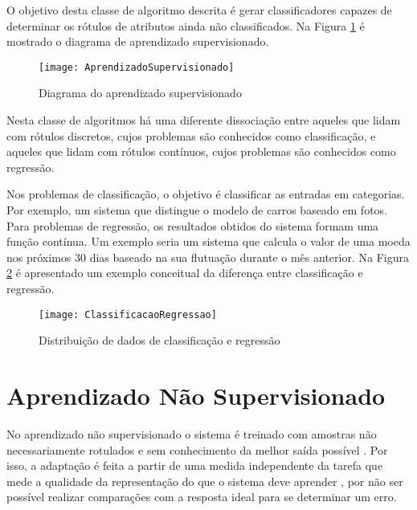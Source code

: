  O objetivo desta classe de algoritmo descrita é gerar classificadores capazes de determinar os rótulos de atributos ainda não classificados.\cite{haykin2009neural, goldschmidt} Na Figura \ref{fig:supervisionado} é mostrado o diagrama de aprendizado supervisionado.
 
 \begin{figure}[htb]
 \caption{\label{fig:supervisionado} Diagrama do aprendizado supervisionado}
 \begin{center}
 \texttt{[image: AprendizadoSupervisionado]}
 \end{center}
 \end{figure}
 
 Nesta classe de algoritmos há uma diferente dissociação entre aqueles que lidam com rótulos discretos, cujos problemas são conhecidos como classificação, e aqueles que lidam com rótulos contínuos, cujos problemas são conhecidos como regressão. 
 
 Nos problemas de classificação, o objetivo é classificar as entradas em categorias. Por exemplo, um sistema que distingue o modelo de carros baseado em fotos. Para problemas de regressão, os resultados obtidos do sistema formam uma função contínua. Um exemplo seria um sistema que calcula o valor de uma moeda nos próximos 30 dias baseado na sua flutuação durante o mês anterior. Na Figura \ref{fig:classregres} é apresentado um exemplo conceitual da diferença entre classificação e regressão.
 
 \begin{figure}[htb]
 \caption{\label{fig:classregres} Distribuição de dados de classificação e regressão}
 \begin{center}
 \texttt{[image: ClassificacaoRegressao]}
 \end{center}
 \end{figure}


\section{Aprendizado Não Supervisionado}
\label{sec:nsuperv}

 No aprendizado não supervisionado o sistema é treinado com amostras não necessariamente rotulados e sem conhecimento da melhor saída possível \cite{haykin2009neural}. Por isso, a adaptação é feita a partir de uma medida independente da tarefa que mede a qualidade da representação do que o sistema deve aprender \cite{beckerneural}, por não ser possível realizar comparações com a resposta ideal para se determinar um erro. 

